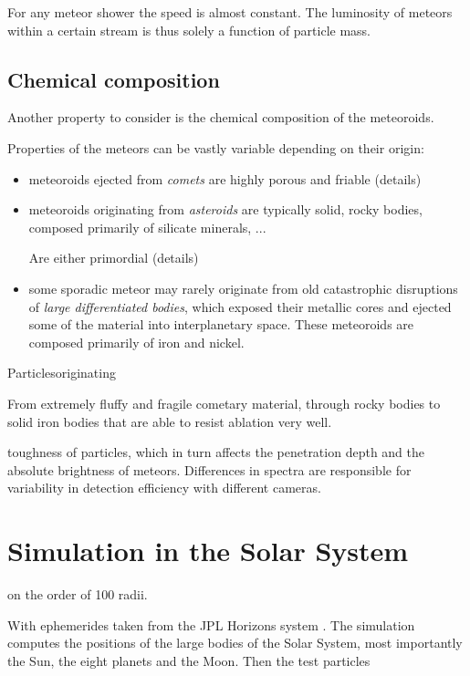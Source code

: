         For any meteor shower the speed is almost constant. The luminosity of meteors
        within a certain stream is thus solely a function of particle mass.

    \subsection{Chemical composition} \label{mac}
        Another property to consider is the chemical composition of the meteoroids.

        Properties of the meteors can be vastly variable depending on their origin:
        \begin{itemize}
            \item meteoroids ejected from \emph{comets} are highly porous and friable
                (details)
            \item meteoroids originating from \emph{asteroids} are typically solid,
                rocky bodies, composed primarily of silicate minerals, ...

                Are either primordial
                (details)
            \item some sporadic meteor may rarely originate from old catastrophic disruptions
                of \emph{large differentiated bodies}, which exposed their metallic cores
                and ejected some of the material into interplanetary space.
                These meteoroids are composed primarily of iron and nickel.
        \end{itemize}
        Particlesoriginating

        From extremely fluffy and fragile cometary material, through rocky bodies
        to solid iron bodies that are able to resist ablation very well.

        toughness of particles, which in turn affects the penetration depth
        and the absolute brightness of meteors.
        Differences in spectra are responsible for variability in detection efficiency with different cameras.

\section{Simulation in the Solar System} \label{as}
    on the order of 100 radii.

    With ephemerides taken from the JPL Horizons system \citep{...}.
    The simulation computes the positions of the large bodies of the Solar System, most importantly the Sun,
    the eight planets and the Moon. Then the test particles

